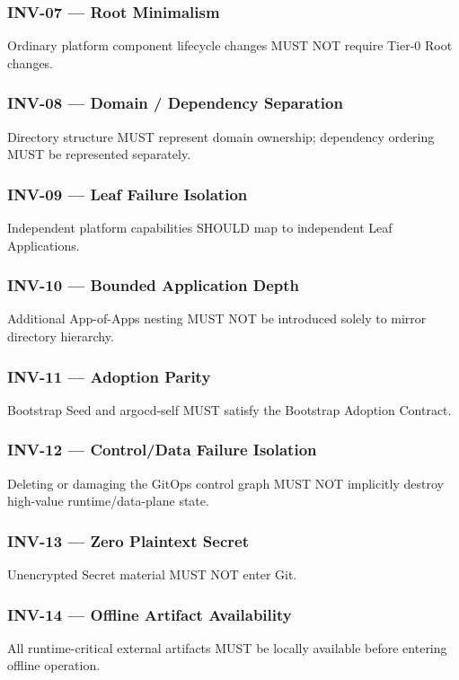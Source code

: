 \documentclass[11pt,a4paper]{article}
\begin{document}
\subsubsection{INV-07 — Root Minimalism}
Ordinary platform component lifecycle changes MUST NOT require Tier-0 Root changes.

\subsubsection{INV-08 — Domain / Dependency Separation}
Directory structure MUST represent domain ownership; dependency ordering MUST be represented separately.

\subsubsection{INV-09 — Leaf Failure Isolation}
Independent platform capabilities SHOULD map to independent Leaf Applications.

\subsubsection{INV-10 — Bounded Application Depth}
Additional App-of-Apps nesting MUST NOT be introduced solely to mirror directory hierarchy.

\subsubsection{INV-11 — Adoption Parity}
Bootstrap Seed and argocd-self MUST satisfy the Bootstrap Adoption Contract.

\subsubsection{INV-12 — Control/Data Failure Isolation}
Deleting or damaging the GitOps control graph MUST NOT implicitly destroy high-value runtime/data-plane state.

\subsubsection{INV-13 — Zero Plaintext Secret}
Unencrypted Secret material MUST NOT enter Git.

\subsubsection{INV-14 — Offline Artifact Availability}
All runtime-critical external artifacts MUST be locally available before entering offline operation.
\end{document}
